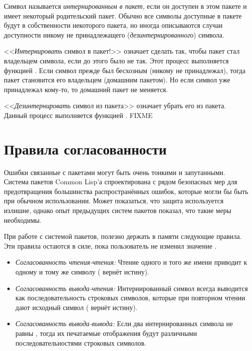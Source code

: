 Символ называется \emph{интернированным в пакет}, если он доступен в этом
пакете и имеет некоторый родительский пакет. Обычно все символы
доступные в пакете будут в собственности некоторого пакета, но иногда
описываются случаи доступности никому не принадлежащего (\emph{дезинтернированного})
символа.

<<\emph{Интернировать} символ в пакет!>> означает сделать так, чтобы
пакет стал владельцем символа, если до этого было не так.
Этот процесс выполняется функцией .
Если символ прежде был бесхозным (никому не принадлежал), тогда пакет становится
его владельцем (домашним пакетом). Но если символ уже принадлежал кому-то, то
домашний пакет не меняется.

<<\emph{Дезинтернировать} символ из пакета>> означает убрать его из пакета. Данный
процесс выполняется функцией . FIXME

\section{Правила согласованности}

Ошибки связанные с пакетами могут быть очень тонкими и запутанными. Система
пакетов Common Lisp'а спроектирована с рядом безопасных мер для
предотвращения большинства распространённых ошибок, которые могли бы быть при
обычном использовании. Может показаться, что защита используется излишне,
однако опыт предыдущих систем пакетов показал, что такие меры необходимы.

При работе с системой пакетов, полезно держать в памяти следующие правила.
Эти правила остаются в силе, пока пользователь не изменил значение .

\begin{itemize}
\item
\emph{Согласованность чтения-чтения:} Чтение одного и того же имени приводит к
одному и тому же символу ( вернёт истину).

\item
\emph{Согласованность вывода-чтения:} Интернированный символ всегда выводится
как последовательность строковых символов, которые при повторном чтении дают
исходный символ ( вернёт истину).

\item 
\emph{Согласованность вывода-вывода:} Если два интернированных символа не равны
, тогда их печатаемые отображения будут различными последовательностями
строковых символов.
\end{itemize}

